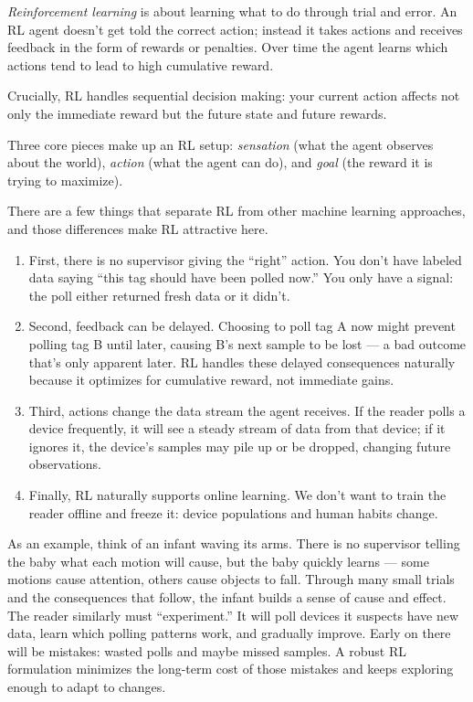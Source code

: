 \textit{Reinforcement learning} is about learning what to do through trial and error. An RL agent doesn’t get told the correct action; instead it takes actions and receives feedback in the form of rewards or penalties. Over time the agent learns which actions tend to lead to high cumulative reward.

Crucially, RL handles sequential decision making: your current action affects not only the immediate reward but the future state and future rewards.

Three core pieces make up an RL setup: \textit{sensation} (what the agent observes about the world), \textit{action} (what the agent can do), and \textit{goal} (the reward it is trying to maximize).

There are a few things that separate RL from other machine learning approaches, and those differences make RL attractive here.
\begin{enumerate}
    \item First, there is no supervisor giving the “right” action. You don’t have labeled data saying “this tag should have been polled now.” You only have a signal: the poll either returned fresh data or it didn’t.
    \item Second, feedback can be delayed. Choosing to poll tag A now might prevent polling tag B until later, causing B’s next sample to be lost — a bad outcome that’s only apparent later. RL handles these delayed consequences naturally because it optimizes for cumulative reward, not immediate gains.
    \item Third, actions change the data stream the agent receives. If the reader polls a device frequently, it will see a steady stream of data from that device; if it ignores it, the device’s samples may pile up or be dropped, changing future observations.
    \item Finally, RL naturally supports online learning. We don’t want to train the reader offline and freeze it: device populations and human habits change.
\end{enumerate}
As an example, think of an infant waving its arms. There is no supervisor telling the baby what each motion will cause, but the baby quickly learns — some motions cause attention, others cause objects to fall. Through many small trials and the consequences that follow, the infant builds a sense of cause and effect.
The reader similarly must “experiment.” It will poll devices it suspects have new data, learn which polling patterns work, and gradually improve. Early on there will be mistakes: wasted polls and maybe missed samples. A robust RL formulation minimizes the long-term cost of those mistakes and keeps exploring enough to adapt to changes.

